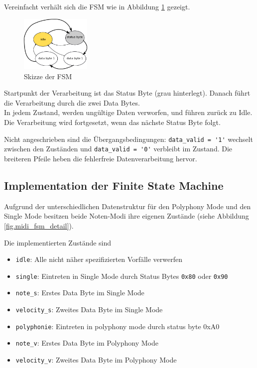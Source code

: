 Vereinfacht verhält sich die FSM wie in Abbildung \ref{fig.midi_fsm_skizze} gezeigt. 

\begin{figure}[H]
	\includegraphics[width=0.3\textwidth]{images/midi_control/fsm_grob_2.png}
	\caption{Skizze der FSM}
	\label{fig.midi_fsm_skizze}
\end{figure}

Startpunkt der Verarbeitung ist das Status Byte (grau hinterlegt). Danach führt die Verarbeitung durch die zwei Data Bytes.\\
In jedem Zustand, werden ungültige Daten verworfen, und führen zurück zu Idle. Die Verarbeitung wird fortgesetzt, wenn das nächste Status Byte folgt.

Nicht angeschrieben sind die Übergangsbedingungen: \lstinline|data_valid = '1'| wechselt zwischen den Zuständen und \lstinline|data_valid = '0'| verbleibt im Zustand. Die breiteren Pfeile heben die fehlerfreie Datenverarbeitung hervor.

\subsection{Implementation der Finite State Machine}

Aufgrund der unterschiedlichen Datenstruktur für den Polyphony Mode und den Single Mode besitzen beide Noten-Modi ihre eigenen Zustände (siehe Abbildung \ref{fig.midi_fsm_detail}).

Die implementierten Zustände sind

\begin{itemize}
	\item \lstinline|idle|: Alle nicht näher spezifizierten Vorfälle verwerfen
	\item \lstinline|single|: Eintreten in  Single Mode durch Status Bytes \lstinline|0x80| oder \lstinline|0x90|
	\item \lstinline|note_s|: Erstes Data Byte im  Single Mode
	\item \lstinline|velocity_s|: Zweites Data Byte im Single Mode
	\item \lstinline|polyphonie|: Eintreten in polyphony mode durch status byte 0xA0
	\item \lstinline|note_v|: Erstes Data Byte im  Polyphony Mode
	\item \lstinline|velocity_v|: Zweites Data Byte im  Polyphony Mode
\end{itemize}
\bigskip

